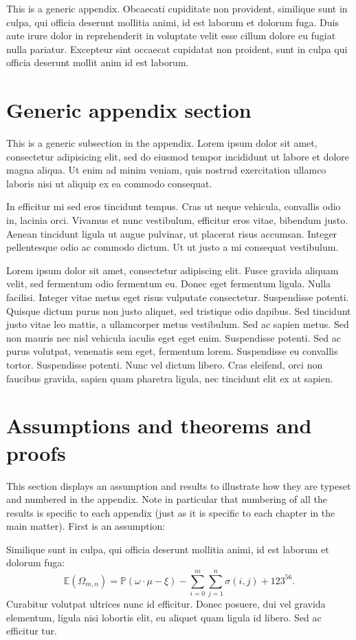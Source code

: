 This is a generic appendix. Obcaecati cupiditate non provident, similique sunt in culpa, qui officia deserunt mollitia animi, id est laborum et dolorum fuga. Duis aute irure dolor in reprehenderit in voluptate velit esse cillum dolore eu fugiat nulla pariatur. Excepteur sint occaecat cupidatat non proident, sunt in culpa qui officia deserunt mollit anim id est laborum. 

\section{Generic appendix section} 

This is a generic subsection in the appendix. Lorem ipsum dolor sit amet, consectetur adipisicing elit, sed do eiusmod tempor incididunt ut labore et dolore magna aliqua. Ut enim ad minim veniam, quis nostrud exercitation ullamco laboris nisi ut aliquip ex ea commodo consequat. 

In efficitur mi sed eros tincidunt tempus. Cras ut neque vehicula, convallis odio in, lacinia orci. Vivamus et nunc vestibulum, efficitur eros vitae, bibendum justo. Aenean tincidunt ligula ut augue pulvinar, ut placerat risus accumsan. Integer pellentesque odio ac commodo dictum. Ut ut justo a mi consequat vestibulum. 

Lorem ipsum dolor sit amet, consectetur adipiscing elit. Fusce gravida aliquam velit, sed fermentum odio fermentum eu. Donec eget fermentum ligula. Nulla facilisi. Integer vitae metus eget risus vulputate consectetur. Suspendisse potenti. Quisque dictum purus non justo aliquet, sed tristique odio dapibus. Sed tincidunt justo vitae leo mattis, a ullamcorper metus vestibulum. Sed ac sapien metus. Sed non mauris nec nisl vehicula iaculis eget eget enim. Suspendisse potenti. Sed ac purus volutpat, venenatis sem eget, fermentum lorem. Suspendisse eu convallis tortor. Suspendisse potenti. Nunc vel dictum libero. Cras eleifend, orci non faucibus gravida, sapien quam pharetra ligula, nec tincidunt elit ex at sapien. 

\section{Assumptions and theorems and proofs}

This section displays an assumption and results to illustrate how they are typeset and numbered in the appendix. Note in particular that numbering of all the results is specific to each appendix (just as it is specific to each chapter in the main matter). First is an assumption:
\begin{assumption} 
Similique sunt in culpa, qui officia deserunt mollitia animi, id est laborum et dolorum fuga:
\begin{equation*}
\mathbb{E}(\Omega_{m,n}) = \mathbb{P}(\omega\cdot \mu - \xi) - \sum_{i=0}^{m}\sum_{j=1}^{n} \sigma(i,j) + 123^{56}.
\end{equation*}
Curabitur volutpat ultrices nunc id efficitur. Donec posuere, dui vel gravida elementum, ligula nisi lobortis elit, eu aliquet quam ligula id libero. Sed ac efficitur tur.
\label{a:appe}\end{assumption}

